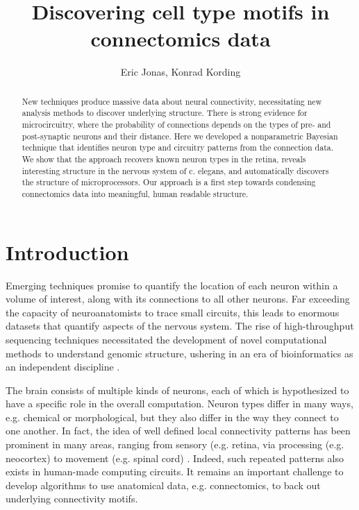 \documentclass{article}
\title{Discovering cell type motifs in connectomics data}
\author{Eric Jonas, Konrad Kording}
\begin{document}
\maketitle


\begin{abstract}
  New techniques produce massive data about neural connectivity,
  necessitating new analysis methods to discover underlying
  structure. There is strong evidence for microcircuitry, where the
  probability of connections depends on the types of pre- and
  post-synaptic neurons and their distance. Here we developed a
  nonparametric Bayesian technique that identifies neuron type and circuitry
  patterns from the connection data. We show that the approach recovers
  known neuron types in the retina, reveals interesting structure in
  the nervous system of c. elegans, and automatically discovers the
  structure of microprocessors. Our approach is a first step towards
  condensing connectomics data into meaningful, human readable
  structure.
\end{abstract}

\section*{Introduction}
Emerging techniques \autocite{Lichtman, Zador, Denk} promise to
quantify the location of each neuron within a volume of interest,
along with its connections to all other neurons. Far exceeding the
capacity of neuroanatomists to trace small circuits, this leads to
enormous datasets that quantify aspects of the nervous system. The
rise of high-throughput sequencing techniques necessitated the
development of novel computational methods to understand genomic
structure, ushering in an era of bioinformatics as an independent
discipline \autocite{}.

The brain consists of multiple kinds of neurons, each of which is
hypothesized to have a specific role in the overall
computation. Neuron types differ in many ways, e.g. chemical or
morphological, but they also differ in the way they connect to one
another. In fact, the idea of well defined local connectivity patterns
has been prominent in many areas, ranging from sensory (e.g. retina,
\autocite{} via processing (e.g. neocortex) to movement (e.g. spinal
cord) \autocite{}. Indeed, such repeated patterns also exists in
human-made computing circuits. It remains an important challenge to
develop algorithms to use anatomical data, e.g. connectomics, to back
out underlying connectivity motifs.
\end{document}
